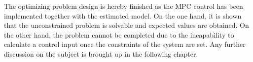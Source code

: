 The optimizing problem design is hereby finished as the MPC control has been implemented together with the estimated model. On the one hand, it is shown that the unconstrained problem is solvable and expected values are obtained. On the other hand, the problem cannot be completed due to the incapability to calculate a control input once the constraints of the system are set. Any further discussion on the subject is brought up in the following chapter. 




%
%
%
%
%
